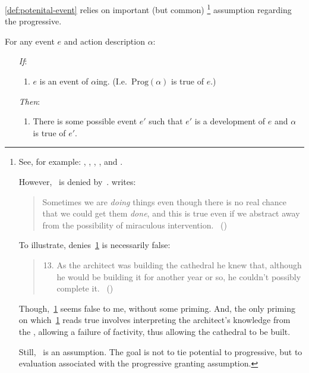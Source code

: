 \begin{note}
  \autoref{def:potenital-event} relies on important (but common)%
  \footnote{
    See, for example:
    \textcite{Bennett:1972uw},
    \textcite{Dowty:1979vq},
    \textcite{Parsons:1990aa},
    \textcite{Landman:1992wh}, and
    \textcite{Portner:1998um}.

    However,~ is denied by~\textcite{Szabo:2004ul}.
    \citeauthor{Szabo:2004ul} writes:
    \begin{quote}
      Sometimes we are \emph{doing} things even though there is no real chance that we could get them \emph{done}, and this is true even if we abstract away from the possibility of miraculous intervention.%
      \mbox{ }\hfill\mbox{(\citeyear[40]{Szabo:2004ul})}
    \end{quote}
    To illustrate, \citeauthor{Szabo:2004ul} denies~\ref{Szabo:Arch} is necessarily false:
    \begin{quote}
      \begin{enumerate}[label=(\arabic*), ref=(\arabic*)]
        \setcounter{enumi}{12}
      \item
        \label{Szabo:Arch}
        As the architect was building the cathedral he knew that, although he would be building it for another year or so, he couldn't possibly complete it.%
        \mbox{ }\hfill\mbox{(\citeyear[38]{Szabo:2004ul})}
      \end{enumerate}
    \end{quote}
    Though,~\ref{Szabo:Arch} seems false to me, without some priming.
    And, the only priming on which~\ref{Szabo:Arch} reads true involves interpreting the architect's knowledge from the , allowing a failure of factivity, thus allowing the cathedral to be built.

    Still,~ is an assumption.
    The goal is not to tie potential to progressive, but to evaluation associated with the progressive granting assumption.
  }
  assumption regarding the progressive.

  \begin{assumption}[\assuPP{2}]
    \label{assu:PP}
    For any event \(e\) and action description \(\alpha\):
    \begin{enumerate}
    \item[\emph{If}:]
      \begin{enumerate}[label=\alph*., ref=(\alph*)]
      \item
        \(e\) is an event of \(\alpha\)ing.%
        \hfill(I.e.\ \(\text{Prog}(\alpha)\) is true of \(e\).)
      \end{enumerate}
    \item[\emph{Then}:]
      \begin{enumerate}[label=\alph*., ref=(\alph*), resume]
      \item
        There is some possible event \(e'\) such that \(e'\) is a development of \(e\) and \(\alpha\) is true of \(e'\).
      \end{enumerate}
    \end{enumerate}
    \vspace{-\baselineskip}
  \end{assumption}


\end{note}
